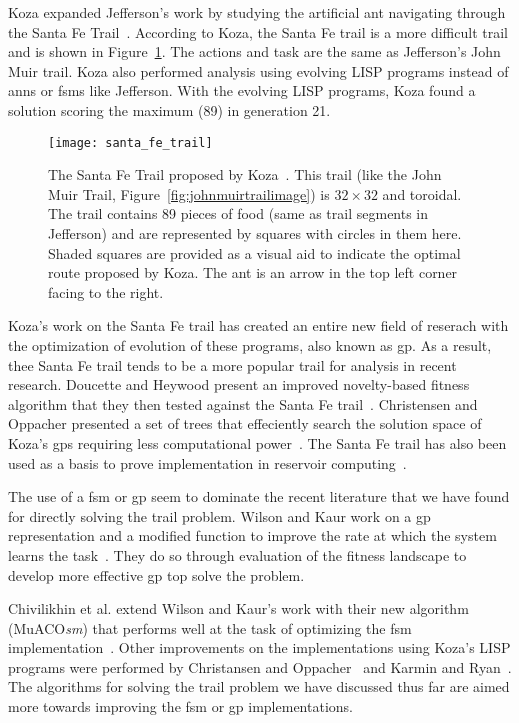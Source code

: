 Koza expanded Jefferson's work by studying the artificial ant navigating through the Santa Fe Trail~\cite{Koza1992-xs}. According to Koza, the Santa Fe trail is a more difficult trail and is shown in Figure~\ref{fig:santa_fe_trail_image}. The actions and task are the same as Jefferson's John Muir trail. Koza also performed analysis using evolving LISP programs instead of \glspl{ann} or \glspl{fsm} like Jefferson. With the evolving LISP programs, Koza found a solution scoring the maximum (89) in generation 21.

\begin{figure}[tbp]
\centering
\texttt{[image: santa\_fe\_trail]}
\caption[Santa Fe Trail]{The Santa Fe Trail proposed by Koza~\cite{Koza1992-xs}. This trail (like the John Muir Trail, Figure~\ref{fig:johnmuirtrailimage}) is $32 \times 32$ and toroidal. The trail contains 89 pieces of food (same as trail segments in Jefferson) and are represented by squares with circles in them here. Shaded squares are provided as a visual aid to indicate the optimal route proposed by Koza. The ant is an arrow in the top left corner facing to the right.}
\label{fig:santa_fe_trail_image}
\end{figure}

Koza's work on the Santa Fe trail has created an entire new field of reserach with the optimization of evolution of these programs, also known as \gls{gp}. As a result, thee Santa Fe trail tends to be a more popular trail for analysis in recent research. Doucette and Heywood present an improved novelty-based fitness algorithm that they then tested against the Santa Fe trail~\cite{Doucette2010-yc}. Christensen and Oppacher presented a set of trees that effeciently search the solution space of Koza's \glspl{gp} requiring less computational power~\cite{Christensen2007-vj}. The Santa Fe trail has also been used as a basis to prove implementation in reservoir computing~\cite{Gargesa2013-rx}.

The use of a \gls{fsm} or \gls{gp} seem to dominate the recent literature that we have found for directly solving the trail problem. Wilson and Kaur work on a \gls{gp} representation and a modified function to improve the rate at which the system learns the task~\cite{Wilson2013-vt}. They do so through evaluation of the fitness landscape to develop more effective \gls{gp} top solve the problem. 

Chivilikhin et al. extend Wilson and Kaur's work with their new algorithm (MuACO\textit{sm}) that performs well at the task of optimizing the \gls{fsm} implementation~\cite{Chivilikhin2013-sw}. Other improvements on the implementations using Koza's LISP programs were performed by Christansen and Oppacher~\cite{Christensen2007-vj} and Karmin and Ryan~\cite{Karim2012-ik}. The algorithms for solving the trail problem we have discussed thus far are aimed more towards improving the \gls{fsm} or \gls{gp} implementations.

